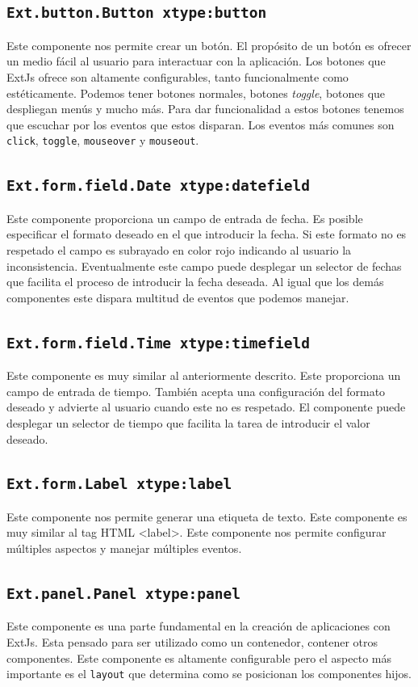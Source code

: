 	\subsection{\texttt{Ext.button.Button xtype:button}}
		Este componente nos permite crear un botón. El propósito de un botón es ofrecer un medio fácil al usuario para interactuar con la
		aplicación. Los botones que ExtJs ofrece son altamente configurables, tanto funcionalmente como estéticamente. Podemos tener botones
		normales, botones \emph{toggle}, botones que despliegan menús y mucho más. Para dar funcionalidad a estos botones tenemos que escuchar
		por los eventos que estos disparan. Los eventos más comunes son \texttt{click}, \texttt{toggle}, \texttt{mouseover} y \texttt{mouseout}.
	\subsection{\texttt{Ext.form.field.Date xtype:datefield}}
		Este componente proporciona un campo de entrada de fecha. Es posible especificar el formato deseado en el que introducir la fecha. Si
		este formato no es respetado el campo es subrayado en color rojo indicando al usuario la inconsistencia. Eventualmente este campo
		puede desplegar un selector de fechas que facilita el proceso de introducir la fecha deseada. Al igual que los demás componentes este
		dispara multitud de eventos que podemos manejar.
	\subsection{\texttt{Ext.form.field.Time xtype:timefield}}
		Este componente es muy similar al anteriormente descrito. Este proporciona un campo de entrada de tiempo. También acepta una
		configuración del formato deseado y advierte  al usuario cuando este no es respetado. El componente puede desplegar un selector de
		tiempo que facilita la tarea de introducir el valor deseado.
	\subsection{\texttt{Ext.form.Label xtype:label}}
		Este componente nos permite generar una etiqueta de texto. Este componente es muy similar al tag HTML <label>. Este componente nos
		permite configurar múltiples aspectos y manejar múltiples eventos.
	\subsection{\texttt{Ext.panel.Panel xtype:panel}}
		Este componente es una parte fundamental en la creación de aplicaciones con ExtJs. Esta pensado para ser utilizado como un contenedor,
		contener otros componentes. Este componente es altamente configurable pero el aspecto más importante es el \texttt{layout} que
		determina como se posicionan los componentes hijos. 
